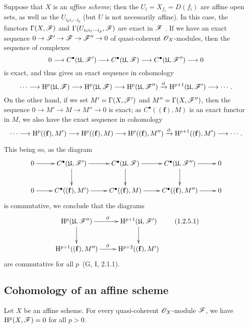 \begin{remark}[1.2.5]
\label{III.1.2.5}
Suppose that $X$ is an \emph{affine scheme}; then the $U_i=X_{f_i}=D(f_i)$ are affine open sets, as well as the $U_{i_0 i_1\cdots i_p}$ (but $U$ is not necessarily affine).
In this case, the functors $\Gamma(X,\mathscr{F})$ and $\Gamma(U_{i_0 i_1\cdots i_p},\mathscr{F})$ are exact in $\mathscr{F}$ .
If we have an exact sequence $0\to\sh{F}'\to\sh{F}\to\sh{F}''\to 0$ of quasi-coherent $\mathscr{O}_X$-modules, then the sequence of complexes
\[
  0\to C^\bullet(\mathfrak{U},\sh{F}')\to C^\bullet(\mathfrak{U},\sh{F})\to C^\bullet(\mathfrak{U},\sh{F}'')\to 0
\]
is exact, and thus gives an exact sequence in cohomology
\[
  \cdots\to\HH^p(\mathfrak{U},\sh{F})\to\HH^p(\mathfrak{U},\sh{F})\to\HH^p(\mathfrak{U},\sh{F}'')\xrightarrow{\partial}\HH^{p+1}(\mathfrak{U},\sh{F}')\to\cdots.
\]
On the other hand, if we set $M'=\Gamma(X,\mathscr{F}')$ and $M''=\Gamma(X,\mathscr{F}'')$, then the sequence $0\to M'\to M\to M''\to 0$ is exact; as $C^\bullet((\mathbf{f}),M)$ is an exact functor in $M$, we also have the exact sequence in cohomology
\[
  \cdots\to\HH^p((\mathbf{f}),M')\to\HH^p((\mathbf{f}),M)\to\HH^p((\mathbf{f}),M'')\xrightarrow{\partial}\HH^{p+1}((\mathbf{f}),M')\to\cdots.
\]

This being so, as the diagram
\[
  \xymatrix{
    0\ar[r] &
    C^\bullet(\mathfrak{U},\sh{F}')\ar[r]\ar[d] &
    C^\bullet(\mathfrak{U},\sh{F})\ar[r]\ar[d] &
    C^\bullet(\mathfrak{U},\sh{F}'')\ar[r]\ar[d] &
    0\\
    0\ar[r] &
    C^\bullet((\mathbf{f}),M')\ar[r] &
    C^\bullet((\mathbf{f}),M)\ar[r] &
    C^\bullet((\mathbf{f}),M'')\ar[r] &
    0
  }
\]
is commutative, we conclude that the diagrams
\[
  \xymatrix{
    \HH^p(\mathfrak{U},\sh{F}'')\ar[r]^\partial\ar[d] &
    \HH^{p+1}(\mathfrak{U},\sh{F}')\ar[d]\\
    \HH^{p+1}((\mathbf{f}),M'')\ar[r]^\partial &
    \HH^{p+2}((\mathbf{f}),M')
  }
  \tag{1.2.5.1}
\]
are commutative for all $p$~(G, I, 2.1.1).
\end{remark}

\subsection{Cohomology of an affine scheme}
\label{subsection:III.1.3}

\begin{theorem}[1.3.1]
\label{III.1.3.1}
Let $X$ be an affine scheme.
For every quasi-coherent $\mathscr{O}_X$-module $\mathscr{F}$, we have $\mathrm{H}^p(X,\mathscr{F})=0$ for all $p>0$.
\end{theorem}

